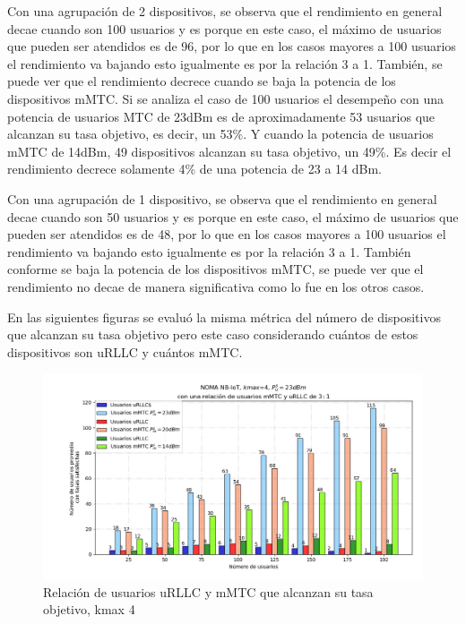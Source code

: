 Con una agrupación de 2 dispositivos, se observa que el rendimiento en general decae cuando son 100 usuarios y es porque en este caso, el máximo de usuarios que pueden ser atendidos es de 96, por lo que en los casos mayores a 100 usuarios el rendimiento va bajando esto igualmente es por la relación 3 a 1. También, se puede ver que el rendimiento decrece cuando se baja la potencia de los dispositivos mMTC. Si se analiza el caso de 100 usuarios el desempeño con una potencia de usuarios MTC de 23dBm es de aproximadamente 53 usuarios que alcanzan su tasa objetivo, es decir, un 53\%. Y cuando la potencia de usuarios mMTC de 14dBm, 49 dispositivos alcanzan su tasa objetivo, un 49\%. Es decir el rendimiento decrece solamente 4\% de una potencia de 23 a 14 dBm.\newline

Con una agrupación de 1 dispositivo, se observa que el rendimiento en general decae cuando son 50 usuarios y es porque en este caso, el máximo de usuarios que pueden ser atendidos es de 48, por lo que en los casos mayores a 100 usuarios el rendimiento va bajando esto igualmente es por la relación 3 a 1. También conforme se baja la potencia de los dispositivos mMTC, se puede ver que el rendimiento no decae de manera significativa como lo fue en los otros casos. \newline

\break

En las siguientes figuras se evaluó la misma métrica del número de dispositivos que alcanzan su tasa objetivo pero este caso considerando cuántos de estos dispositivos son uRLLC y cuántos mMTC.\newline

\begin{figure}[th]
    \centering
    \includegraphics[scale=.65]{Figures/ResultadosNOMA/Kmax4_DiferentesPM.png}
    \decoRule
    \caption[Relación de usuarios uRLLC y mMTC que alcanzan su tasa objetivo, kmax 4]{Relación de usuarios uRLLC y mMTC que alcanzan su tasa objetivo, kmax 4}
    \label{fig:Kmax4_DiferentesPM}
\end{figure}

